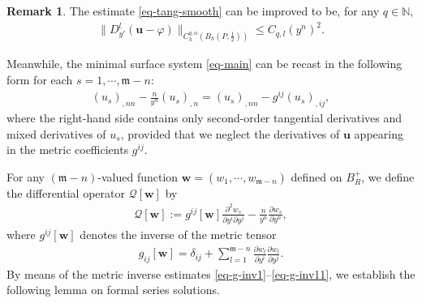 \documentclass[11pt,reqno]{amsart}
\newcommand{\fm}{\mathfrak{m}}
\renewcommand{\leq}{\leqslant}
\theoremstyle{definition}
\newtheorem{remark}[theorem]{Remark}
\numberwithin{equation}{section}
\begin{document}
\begin{remark}\label{rem-tan}
    The estimate \eqref{eq-tang-smooth} can be improved to be, for any $q\in \mathbb{N},$
    \begin{align}\label{eq-tang-smooth-1}
        \|D_{y'}^l (\mathbf u -\varphi)\|_{C^{q, \alpha}_h(B_h(P, \frac{1}{2}))}\leq C_{q,l}(y^n)^{2}.
    \end{align} 
\end{remark}
Meanwhile, the minimal surface system \eqref{eq-main} can be recast in the following form for each $s=1,\cdots, \fm -n$:
\begin{align}\label{eq-g-inv2}
    (u_s)_{,nn} - \frac{n}{y^n}(u_s)_{,n} = (u_s)_{,nn}- g^{ij}(u_{s})_{,ij},
\end{align}
where the right-hand side contains only second-order tangential derivatives and mixed derivatives of $u_s$, provided that we neglect the derivatives of $\mathbf{u}$ appearing in the metric coefficients $g^{ij}$.

For any $(\fm-n)$-valued function $\mathbf{w} = (w_1,\cdots, w_{\fm-n})$ defined on $B^+_R$, we define the differential operator $\mathcal{Q}[\mathbf{w}]$ by
\begin{align}\label{eq-Q}
    \mathcal{Q}[\mathbf{w}] :=g^{ij}[\mathbf{w}]\frac{\partial^2 w_s}{\partial y^i \partial y^j} - \frac{n}{y^{n}} \frac{\partial w_s}{\partial y^{n}},
\end{align}
where $g^{ij}[\mathbf{w}]$ denotes the inverse of the metric tensor
\begin{align}
    g_{ij}[\mathbf{w}] =\delta_{ij} +\sum_{l=1}^{\fm -n} \frac{\partial w_l}{\partial y^i}\frac{\partial w_l}{\partial y^j}.
\end{align}
By means of the metric inverse estimates \eqref{eq-g-inv1}--\eqref{eq-g-inv11}, we establish the following lemma on formal series solutions.
\end{document}
